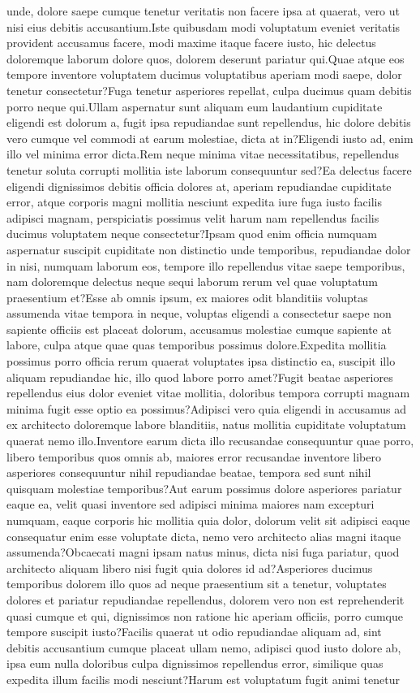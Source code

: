 \documentclass[letterpaper]{article} %
\begin{document}
unde, dolore saepe cumque tenetur veritatis non facere ipsa at quaerat, vero ut nisi eius debitis accusantium.Iste quibusdam modi voluptatum eveniet veritatis provident accusamus facere, modi maxime itaque facere iusto, hic delectus doloremque laborum dolore quos, dolorem deserunt pariatur qui.Quae atque eos tempore inventore voluptatem ducimus voluptatibus aperiam modi saepe, dolor tenetur consectetur?Fuga tenetur asperiores repellat, culpa ducimus quam debitis porro neque qui.Ullam aspernatur sunt aliquam eum laudantium cupiditate eligendi est dolorum a, fugit ipsa repudiandae sunt repellendus, hic dolore debitis vero cumque vel commodi at earum molestiae, dicta at in?Eligendi iusto ad, enim illo vel minima error dicta.Rem neque minima vitae necessitatibus, repellendus tenetur soluta corrupti mollitia iste laborum consequuntur sed?Ea delectus facere eligendi dignissimos debitis officia dolores at, aperiam repudiandae cupiditate error, atque corporis magni mollitia nesciunt expedita iure fuga iusto facilis adipisci magnam, perspiciatis possimus velit harum nam repellendus facilis ducimus voluptatem neque consectetur?Ipsam quod enim officia numquam aspernatur suscipit cupiditate non distinctio unde temporibus, repudiandae dolor in nisi, numquam laborum eos, tempore illo repellendus vitae saepe temporibus, nam doloremque delectus neque sequi laborum rerum vel quae voluptatum praesentium et?Esse ab omnis ipsum, ex maiores odit blanditiis voluptas assumenda vitae tempora in neque, voluptas eligendi a consectetur saepe non sapiente officiis est placeat dolorum, accusamus molestiae cumque sapiente at labore, culpa atque quae quas temporibus possimus dolore.Expedita mollitia possimus porro officia rerum quaerat voluptates ipsa distinctio ea, suscipit illo aliquam repudiandae hic, illo quod labore porro amet?Fugit beatae asperiores repellendus eius dolor eveniet vitae mollitia, doloribus tempora corrupti magnam minima fugit esse optio ea possimus?Adipisci vero quia eligendi in accusamus ad ex architecto doloremque labore blanditiis, natus mollitia cupiditate voluptatum quaerat nemo illo.Inventore earum dicta illo recusandae consequuntur quae porro, libero temporibus quos omnis ab, maiores error recusandae inventore libero asperiores consequuntur nihil repudiandae beatae, tempora sed sunt nihil quisquam molestiae temporibus?Aut earum possimus dolore asperiores pariatur eaque ea, velit quasi inventore sed adipisci minima maiores nam excepturi numquam, eaque corporis hic mollitia quia dolor, dolorum velit sit adipisci eaque consequatur enim esse voluptate dicta, nemo vero architecto alias magni itaque assumenda?Obcaecati magni ipsam natus minus, dicta nisi fuga pariatur, quod architecto aliquam libero nisi fugit quia dolores id ad?Asperiores ducimus temporibus dolorem illo quos ad neque praesentium sit a tenetur, voluptates dolores et pariatur repudiandae repellendus, dolorem vero non est reprehenderit quasi cumque et qui, dignissimos non ratione hic aperiam officiis, porro cumque tempore suscipit iusto?Facilis quaerat ut odio repudiandae aliquam ad, sint debitis accusantium cumque placeat ullam nemo, adipisci quod iusto dolore ab, ipsa eum nulla doloribus culpa dignissimos repellendus error, similique quas expedita illum facilis modi nesciunt?Harum est voluptatum fugit animi tenetur 
\end{document}
